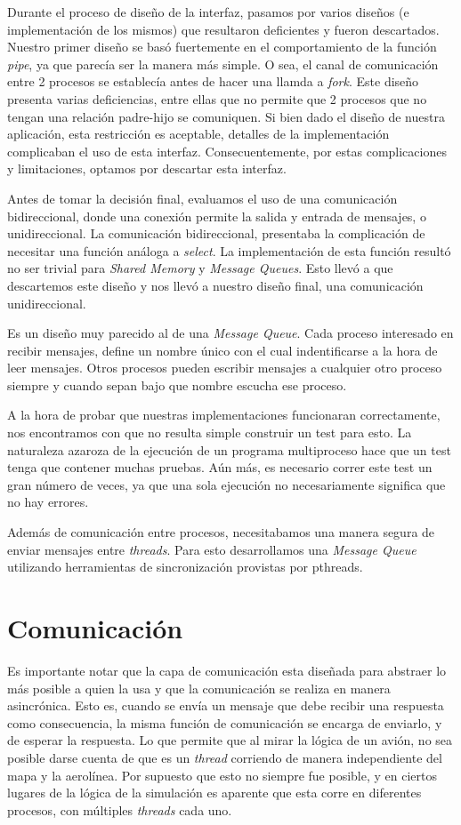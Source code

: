 \documentclass[a4paper,10pt]{article}
\begin{document}
Durante el proceso de diseño de la interfaz, pasamos por varios diseños (e implementación de los mismos) que resultaron deficientes y fueron descartados.
Nuestro primer diseño se basó fuertemente en el comportamiento de la función \textit{pipe}, ya que parecía ser la manera más simple.
O sea, el canal de comunicación entre 2 procesos se establecía antes de hacer una llamda a \textit{fork}.
Este diseño presenta varias deficiencias, entre ellas que no permite que 2 procesos que no tengan una relación padre-hijo se comuniquen.
Si bien dado el diseño de nuestra aplicación, esta restricción es aceptable, detalles de la implementación complicaban el uso de esta interfaz.
Consecuentemente, por estas complicaciones y limitaciones, optamos por descartar esta interfaz.

Antes de tomar la decisión final, evaluamos el uso de una comunicación bidireccional, donde una conexión permite la salida y entrada de mensajes, o unidireccional.
La comunicación bidireccional, presentaba la complicación de necesitar una función análoga a \textit{select}.
La implementación de esta función resultó no ser trivial para \textit{Shared Memory} y \textit{Message Queues}.
Esto llevó a que descartemos este diseño y nos llevó a nuestro diseño final, una comunicación unidireccional.

Es un diseño muy parecido al de una \textit{Message Queue}.
Cada proceso interesado en recibir mensajes, define un nombre único con el cual indentificarse a la hora de leer mensajes.
Otros procesos pueden escribir mensajes a cualquier otro proceso siempre y cuando sepan bajo que nombre escucha ese proceso.

A la hora de probar que nuestras implementaciones funcionaran correctamente, nos encontramos con que no resulta simple construir un test para esto.
La naturaleza azaroza de la ejecución de un programa multiproceso hace que un test tenga que contener muchas pruebas.
Aún más, es necesario correr este test un gran número de veces, ya que una sola ejecución no necesariamente significa que no hay errores.

Además de comunicación entre procesos, necesitabamos una manera segura de enviar mensajes entre \textit{threads}.
Para esto desarrollamos una \textit{Message Queue} utilizando herramientas de sincronización provistas por pthreads.

\newpage
\section{Comunicación}
Es importante notar que la capa de comunicación esta diseñada para abstraer lo más posible a quien la usa y que la comunicación se realiza en manera asincrónica.
Esto es, cuando se envía un mensaje que debe recibir una respuesta como consecuencia, la misma función de comunicación se encarga de enviarlo, y de esperar 
la respuesta. Lo que permite que al mirar la lógica de un avión, no sea posible darse cuenta de que es un \textit{thread} corriendo de manera independiente del mapa y
 la aerolínea. Por supuesto que esto no siempre fue posible, y en ciertos lugares de la lógica de la simulación es aparente que esta corre en diferentes procesos,
 con múltiples \textit{threads} cada uno.
\end{document}
